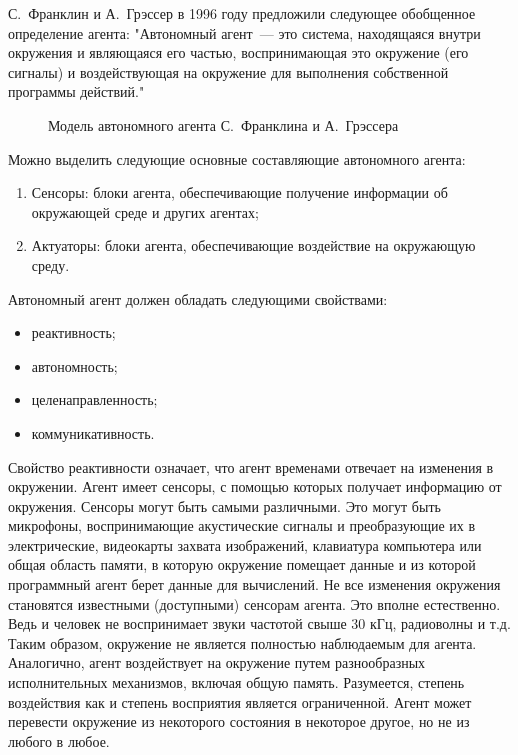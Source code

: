 С.~Франклин и А.~Грэссер в 1996 году предложили следующее обобщенное определение агента: "Автономный агент~--- это система, находящаяся внутри окружения и являющаяся его частью, воспринимающая это окружение (его сигналы) и воздействующая на окружение для выполнения собственной программы действий."
\begin{figure}[h]
\caption{Модель автономного агента С.~Франклина и А.~Грэссера}
\label{1:franklin-agent}
\end{figure}

Можно выделить следующие основные составляющие автономного агента:
\begin{enumerate}
\item Сенсоры: блоки агента, обеспечивающие получение информации об окружающей среде и других агентах;
\item Актуаторы: блоки агента, обеспечивающие воздействие на окружающую среду.
\end{enumerate}

Автономный агент должен обладать следующими свойствами:
\begin{itemize}
\item реактивность;
\item автономность;
\item целенаправленность;
\item коммуникативность.
\end{itemize}

Свойство реактивности означает, что агент временами отвечает на изменения в окружении. Агент имеет сенсоры, с помощью которых получает информацию от окружения. Сенсоры могут быть самыми различными. Это могут быть микрофоны, воспринимающие акустические сигналы и преобразующие их в электрические, видеокарты захвата изображений, клавиатура компьютера или общая область памяти, в которую окружение помещает данные и из которой программный агент берет данные для вычислений. Не все изменения окружения становятся известными (доступными) сенсорам агента. Это вполне естественно. Ведь и человек не воспринимает звуки частотой свыше 30 кГц, радиоволны и т.д. Таким образом, окружение не является полностью наблюдаемым для агента. Аналогично, агент воздействует на окружение путем разнообразных исполнительных механизмов, включая общую память. Разумеется, степень воздействия как и степень восприятия является ограниченной. Агент может перевести окружение из некоторого состояния в некоторое другое, но не из любого в любое.

